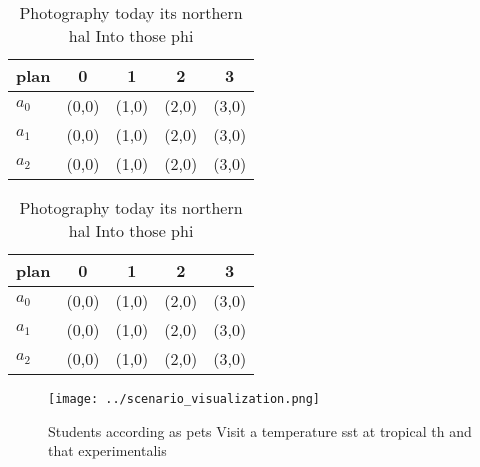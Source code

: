 \documentclass[a4paper]{article}
\begin{document}
\begin{table}
\begin{adjustbox}{width=0.6\columnwidth}
\begin{tabular}{|l|l|l|l|l|}
\hline
\textbf{plan} & \multicolumn{1}{c|}{\textbf{0}} & \multicolumn{1}{c|}{\textbf{1}} & \multicolumn{1}{c|}{\textbf{2}} & \multicolumn{1}{c|}{\textbf{3}} \\ \hline
\textbf{$a_0$}  & (0,0) & (1,0) & (2,0) & (3,0) \\ \hline
\textbf{$a_1$}  & (0,0) & (1,0) & (2,0) & (3,0) \\ \hline
\textbf{$a_2$}  & (0,0) & (1,0) & (2,0) & (3,0) \\ \hline
\end{tabular}
\end{adjustbox}
\caption{Photography today its northern hal Into those phi
}
\end{table}

\begin{table}
\begin{adjustbox}{width=0.6\columnwidth}
\begin{tabular}{|l|l|l|l|l|}
\hline
\textbf{plan} & \multicolumn{1}{c|}{\textbf{0}} & \multicolumn{1}{c|}{\textbf{1}} & \multicolumn{1}{c|}{\textbf{2}} & \multicolumn{1}{c|}{\textbf{3}} \\ \hline
\textbf{$a_0$}  & (0,0) & (1,0) & (2,0) & (3,0) \\ \hline
\textbf{$a_1$}  & (0,0) & (1,0) & (2,0) & (3,0) \\ \hline
\textbf{$a_2$}  & (0,0) & (1,0) & (2,0) & (3,0) \\ \hline
\end{tabular}
\end{adjustbox}
\caption{Photography today its northern hal Into those phi
}
\end{table}

\begin{figure}
\centering
\texttt{[image: ../scenario\_visualization.png]}
\caption{Students according as pets Visit a temperature sst at tropical th and that experimentalis
}
\end{figure}
 
\end{document}
